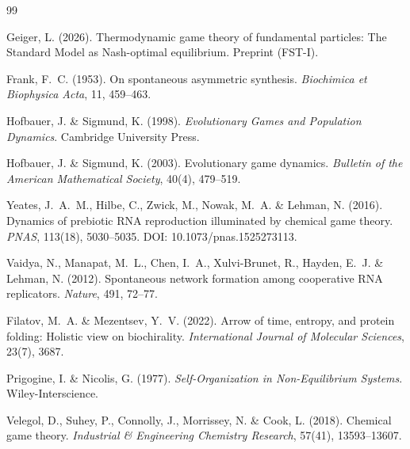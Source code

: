 \documentclass[12pt,a4paper]{article}
\theoremstyle{remark}
\begin{document}


\begin{thebibliography}{99}

Geiger, L. (2026).
\newblock Thermodynamic game theory of fundamental particles: The Standard Model as Nash-optimal equilibrium.
\newblock Preprint (FST-I).

Frank, F.~C. (1953).
\newblock On spontaneous asymmetric synthesis.
\newblock \textit{Biochimica et Biophysica Acta}, 11, 459--463.

Hofbauer, J. \& Sigmund, K. (1998).
\newblock \textit{Evolutionary Games and Population Dynamics}.
\newblock Cambridge University Press.

Hofbauer, J. \& Sigmund, K. (2003).
\newblock Evolutionary game dynamics.
\newblock \textit{Bulletin of the American Mathematical Society}, 40(4), 479--519.

Yeates, J.~A.~M., Hilbe, C., Zwick, M., Nowak, M.~A. \& Lehman, N. (2016).
\newblock Dynamics of prebiotic RNA reproduction illuminated by chemical game theory.
\newblock \textit{PNAS}, 113(18), 5030--5035.
\newblock DOI: 10.1073/pnas.1525273113.

Vaidya, N., Manapat, M.~L., Chen, I.~A., Xulvi-Brunet, R., Hayden, E.~J. \& Lehman, N. (2012).
\newblock Spontaneous network formation among cooperative RNA replicators.
\newblock \textit{Nature}, 491, 72--77.

Filatov, M.~A. \& Mezentsev, Y.~V. (2022).
\newblock Arrow of time, entropy, and protein folding: Holistic view on biochirality.
\newblock \textit{International Journal of Molecular Sciences}, 23(7), 3687.

Prigogine, I. \& Nicolis, G. (1977).
\newblock \textit{Self-Organization in Non-Equilibrium Systems}.
\newblock Wiley-Interscience.

Velegol, D., Suhey, P., Connolly, J., Morrissey, N. \& Cook, L. (2018).
\newblock Chemical game theory.
\newblock \textit{Industrial \& Engineering Chemistry Research}, 57(41), 13593--13607.


\end{thebibliography}
\end{document}
